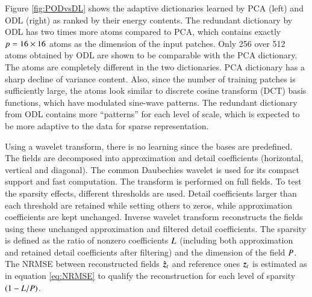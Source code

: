 Figure \ref{fig:PODvsDL} shows the adaptive dictionaries learned by PCA (left) and ODL (right) as ranked by their energy contents. The redundant dictionary by ODL has two times more atoms compared to PCA, which contains exactly $ p = 16 \times 16 $ atoms as the dimension of the input patches. Only 256 over 512 atoms obtained by ODL are shown to be comparable with the PCA dictionary. The atoms are completely different in the two dictionaries. PCA dictionary has a sharp decline of variance content. Also, since the number of training patches is sufficiently large, the atoms look similar to discrete cosine transform (DCT) basis functions, which have modulated sine-wave patterns. The redundant dictionary from ODL contains more ``patterns'' for each level of scale, which is expected to be more adaptive to the data for sparse representation. 

Using a wavelet transform, there is no learning since the bases are predefined. The fields are decomposed into approximation and detail coefficients (horizontal, vertical and diagonal). The common Daubechies wavelet is used for its compact support and fast computation. The transform is performed on full fields. To test the sparsity effects, different thresholds are used. Detail coefficients larger than each threshold are retained while setting others to zeros, while approximation coefficients are kept unchanged. Inverse wavelet transform reconstructs the fields using these unchanged approximation and filtered detail coefficients. The sparsity is defined as the ratio of nonzero coefficients $ L $ (including both approximation and retained detail coefficients after filtering) and the dimension of the field $ P $. The NRMSE between reconstructed fields $ \hat{\operatorname{\boldsymbol{z}}}_t $ and reference ones $ \operatorname{\boldsymbol{z}}_t $ is estimated as in equation \ref{eq:NRMSE} to qualify the reconstruction for each level of sparsity $ (1- L/P )$.

